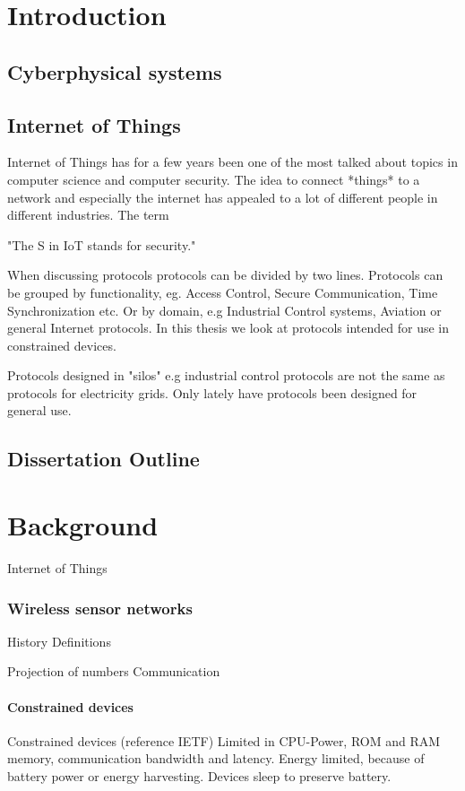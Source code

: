 \chapter{Introduction}
\section{Cyberphysical systems}


\section{Internet of Things}
Internet of Things has for a few years been one of the most talked about topics in computer science and computer security. The idea to connect *things* to a network and especially the internet has appealed to a lot of different people in different industries. The term 

"The S in IoT stands for security."



When discussing protocols protocols can be divided by two lines. Protocols can be grouped by functionality, eg. Access Control, Secure Communication, Time Synchronization etc. Or by domain, e.g Industrial Control systems, Aviation or general Internet protocols. 
In this thesis we look at protocols intended for use in constrained devices. 

Protocols designed in "silos" e.g industrial control protocols are not the same as protocols for electricity grids. 
Only lately have protocols been designed for general use. 

\section{Dissertation Outline}
\chapter{Background}
Internet of Things 
\subsection{Wireless sensor networks}
History
Definitions

Projection of numbers
Communication

\subsubsection{Constrained devices}
Constrained devices (reference IETF)
Limited in CPU-Power, ROM and RAM memory, communication bandwidth and latency. Energy limited, because of battery power or energy harvesting.
Devices sleep to preserve battery.
\cite{rfc7228}

